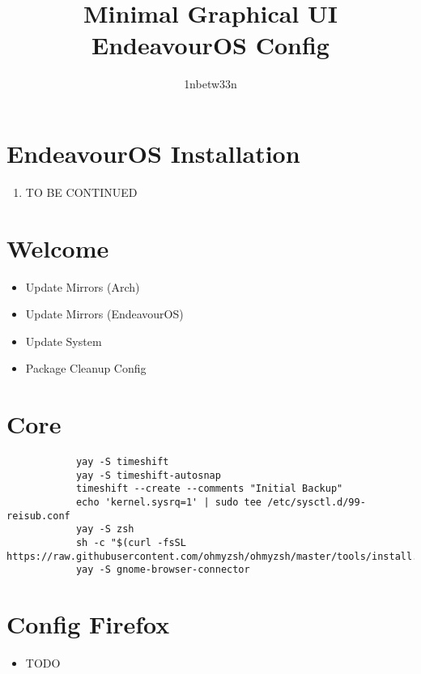 \documentclass[12pt]{article}
\title{Minimal Graphical UI EndeavourOS Config}
\author{1nbetw33n}
\begin{document}
    \maketitle

    \section{EndeavourOS Installation}\label{sec:endeavouros-installation}
        \begin{enumerate}
            \item TO BE CONTINUED
        \end{enumerate}

    \section{Welcome}\label{sec:welcome}
        \begin{itemize}
            \item Update Mirrors (Arch)
            \item Update Mirrors (EndeavourOS)
            \item Update System
            \item Package Cleanup Config
        \end{itemize}


    \section{Core}\label{sec:core}
        \begin{verbatim}
            yay -S timeshift
            yay -S timeshift-autosnap
            timeshift --create --comments "Initial Backup"
            echo 'kernel.sysrq=1' | sudo tee /etc/sysctl.d/99-reisub.conf
            yay -S zsh
            sh -c "$(curl -fsSL https://raw.githubusercontent.com/ohmyzsh/ohmyzsh/master/tools/install.sh)"
            yay -S gnome-browser-connector
        \end{verbatim}


    \section{Config Firefox}\label{sec:config-firefox}
        \begin{itemize}
            \item TODO
        \end{itemize}
\end{document}
